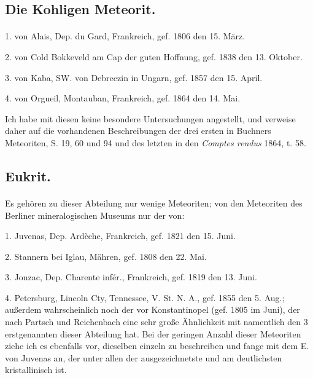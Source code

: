 \documentclass[a4paper, 11pt, oneside]{article}
\begin{document}
\subsection{Die Kohligen Meteorit.}
\paragraph{}
1. von Alais, Dep. du Gard, Frankreich, gef. 1806 den 15. März.

2. von Cold Bokkeveld am Cap der guten Hoffnung, gef. 1838 den 13. Oktober.

3. von Kaba, SW. von Debreczin in Ungarn, gef. 1857 den 15. April.

4. von Orgueil, Montauban, Frankreich, gef. 1864 den 14. Mai.

Ich habe mit diesen keine besondere Untersuchungen angestellt, und verweise daher auf die vorhandenen Beschreibungen der drei ersten in Buchners Meteoriten, S. 19, 60 und 94 und des letzten in den \emph{Comptes rendus} 1864, t. 58.
\subsection{Eukrit.}
\paragraph{}
Es gehören zu dieser Abteilung nur wenige Meteoriten; von den Meteoriten des Berliner mineralogischen Museums nur der von:

1. Juvenas, Dep. Ardèche, Frankreich, gef. 1821 den 15. Juni.

2. Stannern bei Iglau, Mähren, gef. 1808 den 22. Mai.

3. Jonzac, Dep. Charente infér., Frankreich, gef. 1819 den 13. Juni.

4. Petersburg, Lincoln Cty, Tennessee, V. St. N. A., gef. 1855 den 5. Aug.; außerdem wahrscheinlich noch der vor Konstantinopel (gef. 1805 im Juni), der nach Partsch und Reichenbach eine sehr große Ähnlichkeit mit namentlich den 3 erstgenannten dieser Abteilung hat. Bei der geringen Anzahl dieser Meteoriten ziehe ich es ebenfalls vor, dieselben einzeln zu beschreiben und fange mit dem E. von Juvenas an, der unter allen der ausgezeichnetste und am deutlichsten kristallinisch ist.
\end{document}
